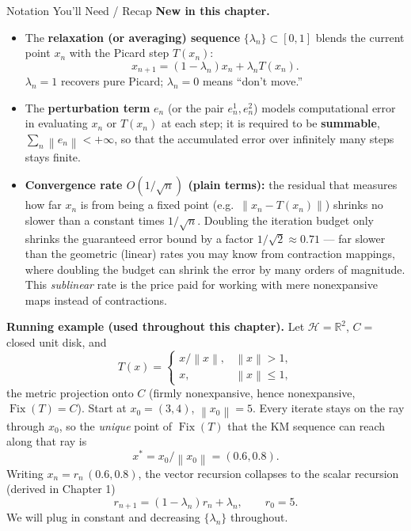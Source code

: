 \documentclass[aspectratio=169,10pt]{beamer}
\newcommand{\cH}{\mathcal{H}}
\newcommand{\Fix}{\operatorname{Fix}}
\newcommand{\R}{\mathbb{R}}
\newcommand{\norm}[1]{\left\|#1\right\|}
\begin{document}
\begin{frame}[allowframebreaks]{Notation You'll Need / Recap}
  \textbf{New in this chapter.}
  \begin{itemize}
    \item The \textbf{relaxation (or averaging) sequence} $\{\lambda_n\}\subset[0,1]$
      blends the current point $x_n$ with the Picard step $T(x_n)$:
      $$x_{n+1}=(1-\lambda_n)x_n+\lambda_n T(x_n).$$
      $\lambda_n=1$ recovers pure Picard; $\lambda_n=0$ means ``don't move.''
    \item The \textbf{perturbation term} $e_n$ (or the pair $e_n^1,e_n^2$)
      models computational error in evaluating $x_n$ or $T(x_n)$ at each
      step; it is required to be \textbf{summable},
      $\sum_{n}\norm{e_n}<+\infty$, so that the accumulated error over
      infinitely many steps stays finite.
    \item \textbf{Convergence rate $O(1/\sqrt n)$ (plain terms):} the
      residual that measures how far $x_n$ is from being a fixed point
      (e.g.\ $\norm{x_n-T(x_n)}$) shrinks no slower than a constant times
      $1/\sqrt n$. Doubling the iteration budget only shrinks the
      guaranteed error bound by a factor $1/\sqrt2\approx0.71$ --- far
      slower than the geometric (linear) rates you may know from
      contraction mappings, where doubling the budget can shrink the
      error by many orders of magnitude. This \emph{sublinear} rate is
      the price paid for working with mere nonexpansive maps instead of
      contractions.
  \end{itemize}

  \framebreak

  \textbf{Running example (used throughout this chapter).}
  Let $\cH=\R^2$, $C=$ closed unit disk, and
  $$T(x)=\begin{cases}x/\norm{x}, & \norm{x}>1,\\ x, & \norm{x}\le 1,\end{cases}$$
  the metric projection onto $C$ (firmly nonexpansive, hence nonexpansive,
  $\Fix(T)=C$). Start at $x_0=(3,4)$, $\norm{x_0}=5$. Every iterate stays
  on the ray through $x_0$, so the \emph{unique} point of $\Fix(T)$ that
  the KM sequence can reach along that ray is
  $$x^*=x_0/\norm{x_0}=(0.6,0.8).$$
  Writing $x_n=r_n\,(0.6,0.8)$, the vector recursion collapses to the
  scalar recursion (derived in Chapter 1)
  $$r_{n+1}=(1-\lambda_n)r_n+\lambda_n, \qquad r_0=5.$$
  We will plug in constant and decreasing $\{\lambda_n\}$ throughout.
\end{frame}

\end{document}

